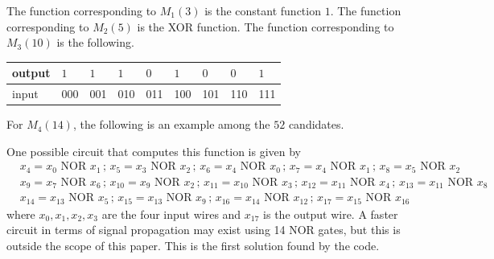 \documentclass[12pt]{amsart}
\newcommand{\NOR}{\text{ NOR }}
\begin{document}
The function corresponding to $M_1(3)$ is the constant function $1$. The function corresponding to $M_2(5)$ is the XOR function. The function corresponding to $M_3(10)$ is the following.
\begin{table}[H]
\begin{tabular}{|l|l|l|l|l|l|l|l|l|}
\hline
output & $1$   & $1$   & $1$   & $0$   & $1$   & $0$   & $0$   & $1$   \\ \hline
input  & 000 & 001 & 010 & 011 & 100 & 101 & 110 & 111 \\ \hline
\end{tabular}
\end{table}
For $M_4(14)$, the following is an example among the $52$ candidates.
\begin{table}[H]
\end{table}
One possible circuit that computes this function is given by
\begin{align*}
&x_4=x_0\NOR x_1\, ;\, x_5=x_3\NOR x_2\,;\,x_6=x_4\NOR x_0\,;\,x_7=x_4\NOR x_1\,;\,x_8=x_5\NOR x_2 \\
&x_9=x_7\NOR x_6\,;\,x_{10}=x_9\NOR x_2\,;\,x_{11}=x_{10}\NOR x_3\,;\,x_{12}=x_{11}\NOR x_4\,;\,x_{13}=x_{11}\NOR x_8 \\
&x_{14}=x_{13}\NOR x_5\,;\,x_{15}=x_{13}\NOR x_9\,;\,x_{16}=x_{14}\NOR x_{12}\,;\,x_{17}=x_{15}\NOR x_{16} 
\end{align*}
 where $x_0,x_1,x_2,x_3$ are the four input wires and $x_{17}$ is the output wire. A faster circuit in terms of signal propagation may exist using 14 NOR gates, but this is outside the scope of this paper. This is the first solution found by the code.
\end{document}
